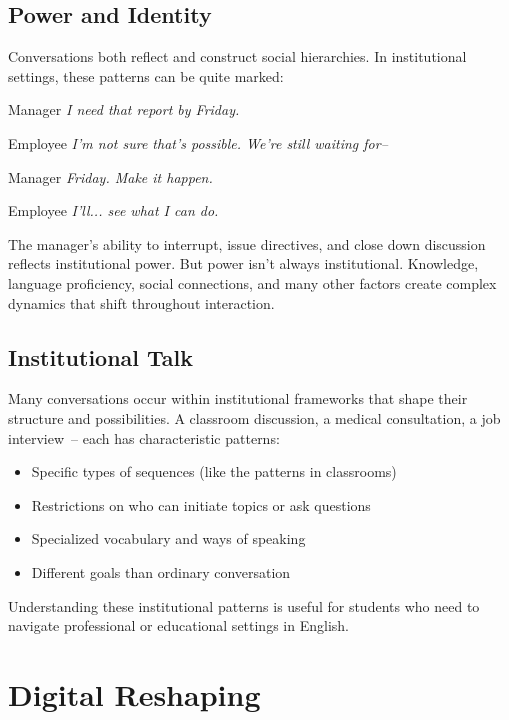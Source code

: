\subsection{Power and Identity} \label{subsec:power}

Conversations both reflect and construct social hierarchies. In institutional settings, these patterns can be quite marked:

\ea
\begin{dialogue}
\item[Manager] \textit{I need that report by Friday.}
\item[Employee] \textit{I'm not sure that's possible. We're still waiting for--}
\item[Manager] \textit{Friday. Make it happen.}
\item[Employee] \textit{I'll... see what I can do.}
\end{dialogue}
\z
The manager's ability to interrupt, issue directives, and close down discussion reflects institutional power. But power isn't always institutional. Knowledge, language proficiency, social connections, and many other factors create complex dynamics that shift throughout interaction.

\subsection{Institutional Talk} \label{subsec:institutional}

Many conversations occur within institutional frameworks that shape their structure and possibilities. A classroom discussion, a medical consultation, a job interview~-- each has characteristic patterns:

\begin{itemize}[noitemsep]
\item Specific types of sequences (like the patterns in classrooms)
\item Restrictions on who can initiate topics or ask questions  
\item Specialized vocabulary and ways of speaking
\item Different goals than ordinary conversation
\end{itemize}
Understanding these institutional patterns is useful for students who need to navigate professional or educational settings in English.

\section{Digital Reshaping} \label{sec:digital}

